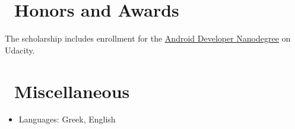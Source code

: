 \documentclass{resume}
\begin{document}
\section{\faHeartO\ Honors and Awards}
The scholarship includes enrollment for the \href{https://www.udacity.com/course/android-developer-nanodegree-by-google--nd801}{Android Developer Nanodegree} on Udacity. 

\section{\faInfo\ Miscellaneous}
\begin{itemize}[parsep=0.5ex]
  \item Languages: Greek, English
\end{itemize}

%
%
\end{document}
